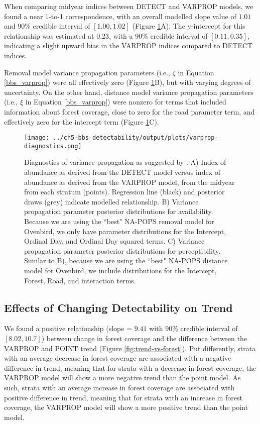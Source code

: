 \par When comparing midyear indices between DETECT and VARPROP models, we found a near 1-to-1 correspondence, with an overall modelled slope value of $1.01$ and 90\% credible interval of $[1.00, 1.02]$ (Figure \ref{fig:varprop-diagnostics}A).
The y-intercept for this relationship was estimated at 0.23, with a 90\% credible interval of $[0.11, 0.35]$, indicating a slight upward bias in the VARPROP indices compared to DETECT indices.

\par Removal model variance propagation parameters (i.e., $\zeta$ in Equation \ref{bbs_varprop}) were all effectively zero (Figure \ref{fig:varprop-diagnostics}B), but with varying degrees of uncertainty.
On the other hand, distance model variance propagation parameters (i.e., $\xi$ in Equation \ref{bbs_varprop}) were nonzero for terms that included information about forest coverage, close to zero for the road parameter term, and effectively zero for the intercept term (Figure \ref{fig:varprop-diagnostics}C).

\begin{figure}[h]
	\texttt{[image: ../ch5-bbs-detectability/output/plots/varprop-diagnostics.png]}
	\caption{Diagnostics of variance propagation as suggested by \citet{bravington_variance_2021}. A) Index of abundance as derived from the DETECT model versus index of abundance as derived from the VARPROP model, from the midyear from each stratum (points). Regression line (black) and posterior draws (grey) indicate modelled relationship. B) Variance propagation parameter posterior distributions for availability. Because we are using the ``best" NA-POPS removal model for Ovenbird, we only have parameter distributions for the Intercept, Ordinal Day, and Ordinal Day squared terms. C) Variance propagation parameter posterior distributions for perceptibility. Similar to B), because we are using the ``best" NA-POPS distance model for Ovenbird, we include distributions for the Intercept, Forest, Road, and interaction terms.}
	\label{fig:varprop-diagnostics}
\end{figure}

\subsection{Effects of Changing Detectability on Trend}
\par We found a positive relationship (slope = $9.41$ with 90\% credible interval of $[8.02, 10.7]$) between change in forest coverage and the difference between the VARPROP and POINT trend (Figure \ref{fig:trend-vs-forest}).
Put differently, strata with an average decrease in forest coverage are associated with a negative difference in trend, meaning that for strata with a decrease in forest coverage, the VARPROP model will show a more negative trend than the point model.
As such, strata with an average increase in forest coverage are associated with positive difference in trend, meaning that for strata with an increase in forest coverage, the VARPROP model will show a more positive trend than the point model.

